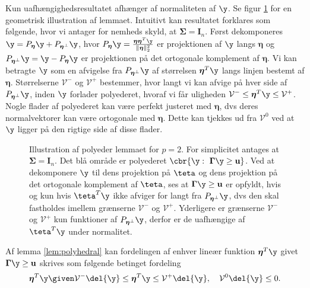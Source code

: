Kun uafhængighedsresultatet afhænger af normaliteten af \(\y\).
Se figur \ref{fig:polyhedron} for en geometrisk illustration af lemmaet.
Intuitivt kan resultatet forklares som følgende, hvor vi antager for nemheds skyld, at \(\boldsymbol{\Sigma}= \mathbf{I}_n\).
Først dekomponeres \(\y=P_{\boldsymbol{\eta}} \y + P_{\boldsymbol{\eta}^\perp} \y\), hvor \(P_{\boldsymbol{\eta}} \y = \frac{\boldsymbol{\eta} \boldsymbol{\eta}^T \y}{\Vert \boldsymbol{\eta} \Vert_2^2}\) er projektionen af \(\y\) langs \(\boldsymbol{\eta}\) og \(P_{\boldsymbol{\eta}^\perp} \y = \y - P_{\boldsymbol{\eta}} \y\) er projektionen på det ortogonale komplement af \(\boldsymbol{\eta}\).
Vi kan betragte \(\y\) som en afvigelse fra \(P_{\boldsymbol{\eta}^\perp} \y\) af størrelsen \(\boldsymbol{\eta}^T \y\) langs linjen bestemt af \(\boldsymbol{\eta}\).
Størrelserne \(\mathcal{V}^-\) og \(\mathcal{V}^+\) bestemmer, hvor langt vi kan afvige på hver side af \(P_{\boldsymbol{\eta}^\perp} \y\), inden \(\y\) forlader polyederet, hvoraf vi får uligheden \(\mathcal{V}^- \leq \boldsymbol{\eta}^T \y \leq \mathcal{V}^+\).
Nogle flader af polyederet kan være perfekt justeret med \(\boldsymbol{\eta}\), dvs deres normalvektorer kan være ortogonale med \(\boldsymbol{\eta}\).
Dette kan tjekkes ud fra \(\mathcal{V}^0\) ved at \(\y\) ligger på den rigtige side af disse flader.  
%
\begin{figure}[H]
\centering
\scalebox{1}{}
\caption{Illustration af polyeder lemmaet for \(p=2\). For simplicitet antages at \(\boldsymbol{\Sigma} = \mathbf{I}_n\). Det blå område er polyederet \(\cbr{\y : \ \boldsymbol{\Gamma} \y \geq \mathbf{u}}\).
Ved at dekomponere \(\y\) til dens projektion på \(\teta\) og dens projektion på det ortogonale komplement af \(\teta\), ses at \(\boldsymbol{\Gamma} \y \geq \mathbf{u}\) er opfyldt, hvis og kun hvis \(\teta^T \y\) ikke afviger for langt fra \(P_{\boldsymbol{\eta}^\perp} \y\), dvs den skal fastholdes imellem grænserne \(\mathcal{V}^-\) og \(\mathcal{V}^+\).
Yderligere er grænserne \(\mathcal{V}^-\) og \(\mathcal{V}^+\) kun funktioner af \(P_{\boldsymbol{\eta}^\perp} \y\), derfor er de uafhængige af \(\teta^T \y\) under normalitet.} \label{fig:polyhedron}
\end{figure}
%
Af lemma \ref{lem:polyhedral} kan fordelingen af enhver lineær funktion \(\boldsymbol{\eta}^T \y\) givet \(\boldsymbol{\Gamma} \y \geq \mathbf{u}\) skrives som følgende betinget fordeling
\begin{align*}
\boldsymbol{\eta}^T \y \given \mathcal{V}^- \del{\y} \leq \boldsymbol{\eta}^T \y \leq \mathcal{V}^+ \del{\y}, \quad \mathcal{V}^0 \del{\y} \leq 0.
\end{align*}
